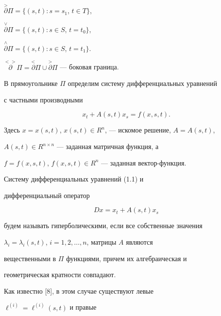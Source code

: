 $\overset{>}{\partial}{}{\Pi}=\{(s,t): s=s_1$, $t \in T \}$,


$\overset{\vee}{\partial}{}{\Pi}=\{(s,t): s \in S$, $t=t_0 \}$,


$\overset{\wedge}{\partial}{}{\Pi}=\{(s,t): s \in S$, $t=t_1 \}$.


$\overset{<>}{\partial}{}{\Pi}=\overset{<}{\partial}{}{\Pi} \cup


\overset{>}{\partial}{}{\Pi}$ --- боковая граница.


В прямоугольнике $\Pi$ определим систему дифференциальных уравнений 


с частными производными 


\begin{equation}


x_t+A(s,t)x_s=f(x,s,t).


\end{equation}


Здесь $x=x(s,t)$, $x(s,t) \in R^n$, --- искомое решение, $A=A(s,t)$, 


$A(s,t) \in R^{n \times n}$ --- заданная матричная функция, а


$f=f(x,s,t)$, $f(x,s,t) \in R^n$ --- заданная вектор-функция.





\begin{defns}


Систему дифференциальных уравнений (1.1) и 


дифференциальный оператор 


\begin{equation}


Dx=x_t+A(s,t)x_s 


\end{equation}


будем называть гиперболическими, если все собственные значения 


$\lambda_i=\lambda_i(s,t)$, $i=1,2,\dotsc,n$, матрицы $A$ являются


вещественными в $\Pi$ функциями, причем их алгебраическая и 


геометрическая кратности совпадают. 


\end{defns}





Как известно [8], в этом случае существуют левые 


$\ell^{(i)}=\ell^{(i)}(s,t)$ и правые 


